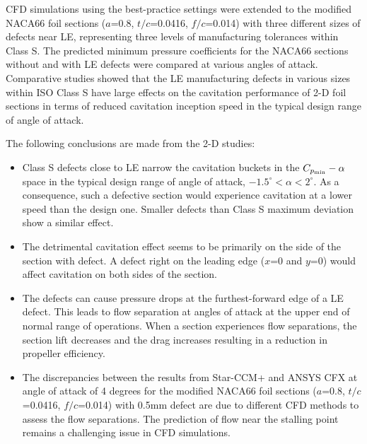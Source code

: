 \documentclass[onecolumn,11pt]{report}
\begin{document}
CFD simulations using the best-practice settings were extended to the modified NACA66 foil sections ($a$=0.8, $t/c$=0.0416, $f/c$=0.014) with three different sizes of defects near LE, representing three levels of manufacturing tolerances within Class S. The predicted minimum pressure coefficients for the NACA66 sections without and with LE defects were compared at various angles of attack. Comparative studies showed that the LE manufacturing defects in various sizes within ISO Class S have large effects on the cavitation performance of 2-D foil sections in terms of reduced cavitation inception speed in the typical design range of angle of attack. 

The following conclusions are made from the 2-D studies:

\begin{itemize}

\item Class S defects close to LE narrow the cavitation buckets in the $C_{p_{\rm min}}-\alpha$ space in the typical design range of angle of attack, $-1.5^\circ<\alpha<2^\circ$. As a consequence, such a defective section would experience cavitation at a lower speed than the design one. Smaller defects than Class S maximum deviation show a similar effect.

\item The detrimental cavitation effect seems to be primarily on the side of the section with defect. A defect right on the leading edge ($x$=0 and $y$=0) would affect cavitation on both sides of the section. 

\item The defects can cause pressure drops at the furthest-forward edge of a LE defect. This leads to flow separation at angles of attack at the upper end of normal range of operations. When a section experiences flow separations, the section lift decreases and the drag increases resulting in a reduction in propeller efficiency.

\item The discrepancies between the results from Star-CCM+ and ANSYS CFX at angle of attack of 4 degrees for the modified NACA66 foil sections ($a$=0.8, $t/c$=0.0416, $f/c$=0.014) with 0.5mm defect are due to different CFD methods to assess the flow separations. The prediction of flow near the stalling point remains a challenging issue in CFD simulations.

\end{itemize}


\end{document}
